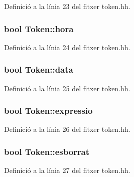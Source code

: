 Definició a la línia 23 del fitxer token.\+hh.

\hypertarget{class_token_a64b32630460ba9c9e43b0ab4954e346d}{}
\subsubsection[{hora}]{\setlength{\rightskip}{0pt plus 5cm}bool Token\+::hora\hspace{0.3cm}{\ttfamily [private]}}\label{class_token_a64b32630460ba9c9e43b0ab4954e346d}


Definició a la línia 24 del fitxer token.\+hh.

\hypertarget{class_token_af793ed1062684808c32526e66c0317da}{}
\subsubsection[{data}]{\setlength{\rightskip}{0pt plus 5cm}bool Token\+::data\hspace{0.3cm}{\ttfamily [private]}}\label{class_token_af793ed1062684808c32526e66c0317da}


Definició a la línia 25 del fitxer token.\+hh.

\hypertarget{class_token_a2f7bd6d2dc4ec43eeeb803c7ec66c4a9}{}
\subsubsection[{expressio}]{\setlength{\rightskip}{0pt plus 5cm}bool Token\+::expressio\hspace{0.3cm}{\ttfamily [private]}}\label{class_token_a2f7bd6d2dc4ec43eeeb803c7ec66c4a9}


Definició a la línia 26 del fitxer token.\+hh.

\hypertarget{class_token_a696eb24f3f0cce53d3b062973013c347}{}
\subsubsection[{esborrat}]{\setlength{\rightskip}{0pt plus 5cm}bool Token\+::esborrat\hspace{0.3cm}{\ttfamily [private]}}\label{class_token_a696eb24f3f0cce53d3b062973013c347}


Definició a la línia 27 del fitxer token.\+hh.

